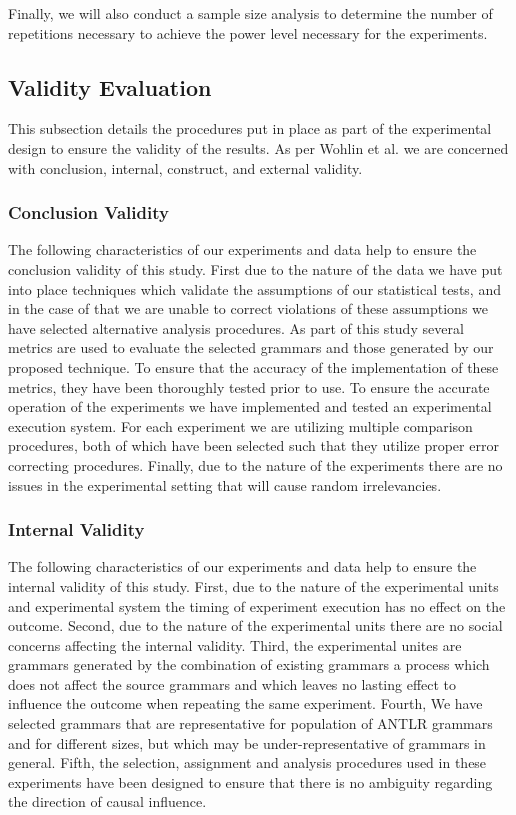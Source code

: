 \documentclass[10pt,nocc]{xrese_report}
\begin{document}
Finally, we will also conduct a sample size analysis to determine the number of repetitions necessary to achieve the power level necessary for the experiments.

\subsection{Validity Evaluation}

This subsection details the procedures put in place as part of the experimental design to ensure the validity of the results. As per Wohlin et al. \cite{wohlin_experimentation_2012} we are concerned with conclusion, internal, construct, and external validity.

\subsubsection{Conclusion Validity}

The following characteristics of our experiments and data help to ensure the conclusion validity of this study. First due to the nature of the data we have put into place techniques which validate the assumptions of our statistical tests, and in the case of that we are unable to correct violations of these assumptions we have selected alternative analysis procedures. As part of this study several metrics are used to evaluate the selected grammars and those generated by our proposed technique. To ensure that the accuracy of the implementation of these metrics, they have been thoroughly tested prior to use. To ensure the accurate operation of the experiments we have implemented and tested an experimental execution system. For each experiment we are utilizing multiple comparison procedures, both of which have been selected such that they utilize proper error correcting procedures. Finally, due to the nature of the experiments there are no issues in the experimental setting that will cause random irrelevancies.

\subsubsection{Internal Validity}

The following characteristics of our experiments and data help to ensure the internal validity of this study. First, due to the nature of the experimental units and experimental system the timing of experiment execution has no effect on the outcome. Second, due to the nature of the experimental units there are no social concerns affecting the internal validity. Third, the experimental unites are grammars generated by the combination of existing grammars a process which does not affect the source grammars and which leaves no lasting effect to influence the outcome when repeating the same experiment. Fourth, We have selected grammars that are representative for population of ANTLR grammars and for different sizes, but which may be under-representative of grammars in general. Fifth, the selection, assignment and analysis procedures used in these experiments have been designed to ensure that there is no ambiguity regarding the direction of causal influence.
\end{document}
